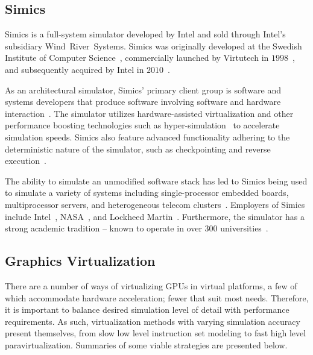 \subsection{Simics}
\label{sec:simics}
Simics is a full-system simulator developed by Intel and sold through Intel's subsidiary Wind~River~Systems.
Simics was originally developed at the Swedish Institute of Computer Science~, commercially launched by Virtutech in $1998$~, and subsequently acquired by Intel in $2010$~.

As an architectural simulator, Simics' primary client group is software and systems developers that produce software involving software and hardware interaction~.
The simulator utilizes hardware-assisted virtualization and other performance boosting technologies such as hyper-simulation~ to accelerate simulation speeds.
Simics also feature advanced functionality adhering to the deterministic nature of the simulator, such as checkpointing and reverse execution~.

The ability to simulate an unmodified software stack has led to Simics being used to simulate a variety of systems including single-processor embedded boards, multiprocessor servers, and heterogeneous telecom clusters~.
Employers of Simics include Intel~, NASA~, and Lockheed Martin~.
Furthermore, the simulator has a strong academic tradition -- known to operate in over $300$ universities~.

\subsection{Graphics Virtualization}
\label{sec:previousresearch_graphicsvirtualization}
There are a number of ways of virtualizing GPUs in virtual platforms, a few of which accommodate hardware acceleration; fewer that suit most needs.
Therefore, it is important to balance desired simulation level of detail with performance requirements.
As such, virtualization methods with varying simulation accuracy present themselves, from slow low level instruction set modeling to fast high level paravirtualization.
Summaries of some viable strategies are presented below.

